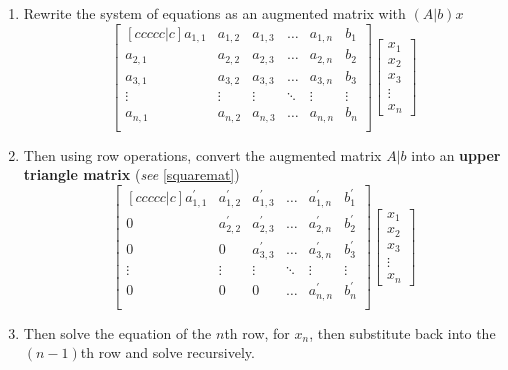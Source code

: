 \documentclass[a4paper]{article}
\begin{document}
  \begin{enumerate}
    \item Rewrite the system of equations as an augmented matrix with $(A|b)x$ 
      \[
        \begin{bmatrix}[ccccc|c]
          a_{1,1} & a_{1,2} & a_{1,3}& \dots & a_{1,n} & b_1\\
          a_{2,1} & a_{2,2} & a_{2,3}&\dots & a_{2,n} & b_2\\
          a_{3,1} & a_{3,2} & a_{3,3}&\dots & a_{3,n} & b_3\\
          \vdots & \vdots & \vdots&\ddots & \vdots& \vdots\\
          a_{n,1} & a_{n,2} & a_{n,3}&\dots & a_{n,n} & b_n\\
        \end{bmatrix}
        \begin{bmatrix}
         x_1 \\ x_2 \\ x_3 \\ \vdots \\ x_n 
        \end{bmatrix}
      \]
    \item Then using row operations, convert the augmented matrix $A|b$ into an \textbf{upper triangle matrix} (\textit{see} \ref{squaremat}) 
      \[
        \begin{bmatrix}[ccccc|c]
          a_{1,1}^\prime & a_{1,2}^\prime & a_{1,3}^\prime& \dots & a_{1,n}^\prime & b_1^\prime\\
          0 & a_{2,2}^\prime & a_{2,3}^\prime&\dots & a_{2,n}^\prime & b_2^\prime\\
          0 & 0 & a_{3,3}^\prime&\dots & a_{3,n}^\prime & b_3^\prime\\
          \vdots & \vdots & \vdots&\ddots & \vdots& \vdots\\
          0 & 0 & 0&\dots & a_{n,n}^\prime & b_n^\prime\\
        \end{bmatrix}
        \begin{bmatrix}
         x_1 \\ x_2 \\ x_3 \\ \vdots \\ x_n 
        \end{bmatrix}
      \]
    \item Then solve the equation of the $n$th row, for $x_n$, then substitute back into the $(n-1)$th row and solve recursively.
  \end{enumerate}
\end{document}
